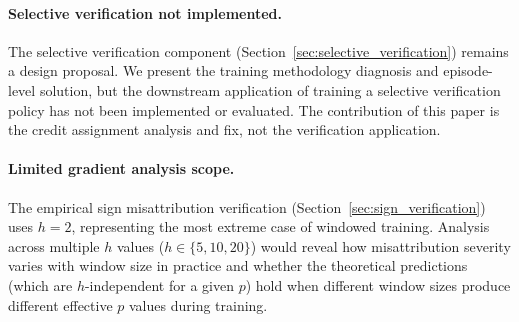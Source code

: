 \paragraph{Selective verification not implemented.} The selective verification component (Section~\ref{sec:selective_verification}) remains a design proposal. We present the training methodology diagnosis and episode-level solution, but the downstream application of training a selective verification policy has not been implemented or evaluated. The contribution of this paper is the credit assignment analysis and fix, not the verification application.

\paragraph{Limited gradient analysis scope.} The empirical sign misattribution verification (Section~\ref{sec:sign_verification}) uses $h = 2$, representing the most extreme case of windowed training. Analysis across multiple $h$ values ($h \in \{5, 10, 20\}$) would reveal how misattribution severity varies with window size in practice and whether the theoretical predictions (which are $h$-independent for a given $p$) hold when different window sizes produce different effective $p$ values during training.
